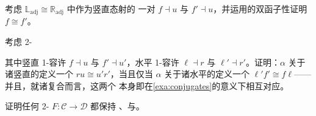 \begin{exercise}\label{ex:left-adjoints-isomorphic}
考虑 $\mathbb{L}_{\mathrm{adj}}\cong\mathbb{R}_{\mathrm{adj}}$ 中作为竖直态射的
一对\trAdjunction{} $f\dashv u$ 与 $f'\dashv u$，并运用\trMate{}的双函子性证明
$f\cong f'$。
\end{exercise}

\begin{exercise}\label{ex:horizontal-vertical-mates}
考虑 2-\trCell
\begin{center}
\end{center}
其中竖直 1-\trCell{}容许\trRightAdjoint{} $f\dashv u$ 与 $f'\dashv u'$，水平
1-\trCell{}容许\trLeftAdjoint{} $\ell\dashv r$ 与 $\ell'\dashv r'$。证明：$\alpha$
关于诸竖直\trAdjunction{}的\trMate{}定义一个\trIsomorphism{} $ru\cong u'r'$，当且仅当
$\alpha$ 关于诸水平\trAdjunction{}的\trMate{}定义一个\trIsomorphism{}
$\ell'f'\cong f\ell$——并且，就诸复合\trAdjunction{}而言，这两个\trIsomorphism{}%
本身即在\cref{exa:conjugates}的意义下相互对应。
\end{exercise}

\begin{exercise}\label{ex:two-functor-preserves-mates}
证明任何 2-\trFunctor{} $F\colon\mathcal{C}\to\mathcal{D}$ 都保持%
\trEquivalence、\trAdjunction{}与\trMate。
\end{exercise}


